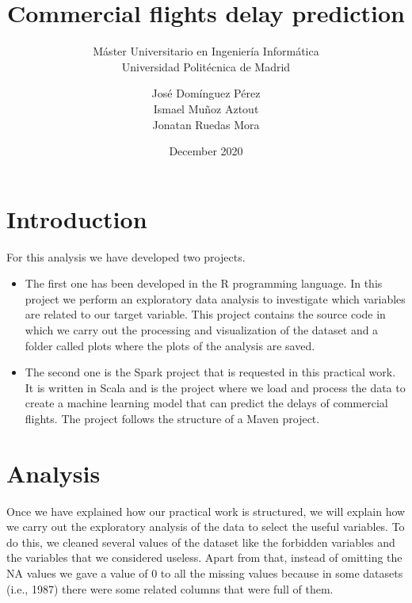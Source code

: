 

\title{Commercial flights delay prediction}
\subtitle{Máster Universitario en Ingeniería Informática\\
		  Universidad Politécnica de Madrid}
\author{José Domínguez Pérez\\
		Ismael Muñoz Aztout\\
		Jonatan Ruedas Mora}
\date{December 2020}

\makeindex

\maketitle
\tableofcontents
\newpage

\section{Introduction}

For this analysis we have developed two projects.

\begin{itemize}

	\item The first one has been developed in the R programming language. In this project we perform an exploratory data analysis to investigate which variables are related to our target variable. This project contains the source code in which we carry out the processing and visualization of the dataset and a folder called plots where the plots of the analysis are saved.

	\item The second one is the Spark project that is requested in this practical work. It is written in Scala and is the project where we load and process the data to create a machine learning model that can predict the delays of commercial flights. The project follows the structure of a Maven project.
	
\end{itemize}

\section{Analysis}

Once we have explained how our practical work is structured, we will explain how we carry out the exploratory analysis of the data to select the useful variables. To do this, we cleaned several values of the dataset like the forbidden variables and the variables that we considered useless. Apart from that, instead of omitting the NA values we gave a value of 0 to all the missing values because in some datasets (i.e., 1987) there were some related columns that were full of them.\\

